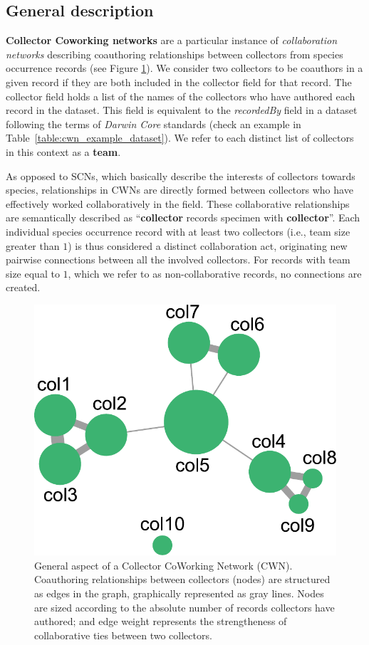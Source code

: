 {\subsection{General description}
\textbf{Collector Coworking networks} are a particular instance of \textit{collaboration networks} describing coauthoring relationships between collectors from species occurrence records (see Figure \ref{fig:cwn_general}).
We consider two collectors to be coauthors in a given record if they are both included in the collector field for that record. The collector field holds a list of the names of the collectors who have authored each record in the dataset. This field is equivalent to the \textit{recordedBy} field in a dataset following the terms of \textit{Darwin Core} standards (check an example in Table~\ref{table:cwn_example_dataset}). We refer to each distinct list of collectors in this context as a \textbf{team}.

As opposed to SCNs, which basically describe the interests of collectors towards species, relationships in CWNs are directly formed between collectors who have effectively worked collaboratively in the field. These collaborative relationships are semantically described as ``\textbf{collector} records specimen with \textbf{collector}''.
Each individual species occurrence record with at least two collectors (i.e., team size greater than $1$) is thus considered a distinct collaboration act, originating new pairwise connections between all the involved collectors.
For records with team size equal to $1$, which we refer to as non-collaborative records, no connections are created.

  \begin{figure}[h!]
  	\centering
    \includegraphics[width=.4\linewidth]{figures/network_models/cwn_generalaspect.pdf}
    \caption[General aspect of a Collector CoWorking Network (CWN)]{General aspect of a Collector CoWorking Network (CWN). Coauthoring relationships between collectors (nodes) are structured as edges in the graph, graphically represented as gray lines.
    Nodes are sized according to the absolute number of records collectors have authored; and edge weight represents the strengtheness of collaborative ties between two collectors.}
    \label{fig:cwn_general}
  \end{figure}

}
